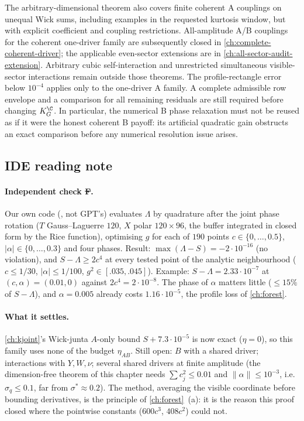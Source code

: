 The arbitrary-dimensional theorem also covers finite coherent A
couplings on unequal Wick sums, including examples in the requested
kurtosis window, but with explicit coefficient and coupling restrictions.
All-amplitude A/B couplings for the coherent one-driver family are
subsequently closed in \autoref{ch:complete-coherent-driver}; the applicable
even-sector extensions are in \autoref{ch:all-sector-audit-extension}.
Arbitrary cubic self-interaction and unrestricted simultaneous
visible-sector interactions remain outside those theorems.
The profile-rectangle error below $10^{-4}$ applies only to the
one-driver A family. A complete admissible row envelope and a comparison
for all remaining residuals are still required before changing
$K_G^{\C}$. In particular, the numerical B phase relaxation must not be
reused as if it were the honest coherent B payoff: its artificial
quadratic gain obstructs an exact comparison before any numerical
resolution issue arises.

\subsection{IDE reading note}\label{sec:coherent-reading}
\paragraph{Independent check \st{F}.} Our own code (, not GPT's) evaluates $\Lambda$ by quadrature after the joint phase rotation
($T$ Gauss--Laguerre $120$, $X$ polar $120\times96$, the buffer integrated in closed form by the Rice function), optimising $g$ for each of $190$ points
$c\in\{0,\dots,0.5\}$, $|\alpha|\in\{0,\dots,0.3\}$ and four phases. Result: $\max(\Lambda-S)=-2\cdot10^{-16}$ (no violation), and $S-\Lambda\ge2c^4$ at every tested point of the analytic
neighbourhood ($c\le1/30$, $|\alpha|\le1/100$, $g^2\in[.035,.045]$). Example: $S-\Lambda=2.33\cdot10^{-7}$ at $(c,\alpha)=(0.01,0)$ against $2c^4=2\cdot10^{-8}$. The phase of $\alpha$
matters little ($\le15\%$ of $S-\Lambda$), and $\alpha=0.005$ already costs $1.16\cdot10^{-5}$, the profile loss of \autoref{ch:forest}.
\paragraph{What it settles.} \autoref{ch:kjoint}'s Wick-junta $A$-only bound $S+7.3\cdot10^{-5}$ is now exact ($\eta=0$), so this family uses none of the budget $\eta_{AB}$. Still open:
$B$ with a shared driver; interactions with $Y,W,\nu$; several shared drivers at finite amplitude (the dimension-free theorem of this chapter needs $\sum c_j^2\le0.01$ and $\|\alpha\|\le10^{-3}$,
i.e.\ $\sigma_q\le0.1$, far from $\sigma^*\approx0.2$). The method, averaging the visible coordinate before bounding derivatives, is the principle of \autoref{ch:forest}~(a): it is the
reason this proof closed where the pointwise constants ($600c^3$, $408c^2$) could not.
